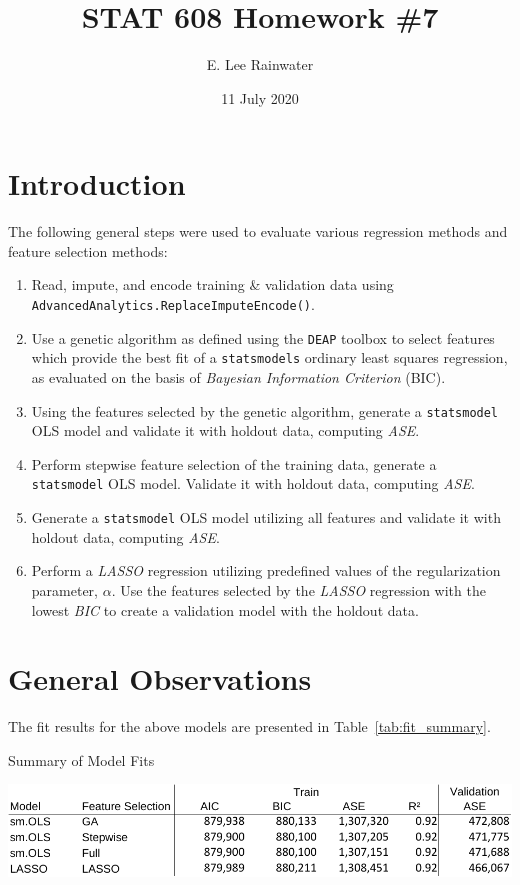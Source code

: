 \documentclass[12pt]{article}
\title{STAT 608 Homework \#7}
\author{E. Lee Rainwater}
\date{11 July 2020}
\begin{document}
\maketitle

\section{Introduction}

The following general steps were used to evaluate various regression
methods and feature selection methods: 
\begin{enumerate}
\item Read, impute, and encode training \& validation data using\\
 \texttt{AdvancedAnalytics.ReplaceImputeEncode()}. 
\item Use a genetic algorithm as defined using the \texttt{DEAP} toolbox
to select features which provide the best fit of a \texttt{statsmodels}
ordinary least squares regression, as evaluated on the basis of \textit{Bayesian
Information Criterion} (BIC). 
\item Using the features selected by the genetic algorithm, generate a \texttt{statsmodel}
OLS model and validate it with holdout data, computing \textit{ASE}. 
\item Perform stepwise feature selection of the training data, generate
a \texttt{statsmodel} OLS model. Validate it with holdout data, computing
\textit{ASE}. 
\item Generate a \texttt{statsmodel} OLS model utilizing all features and
validate it with holdout data, computing \textit{ASE}. 
\item Perform a \textit{LASSO} regression utilizing predefined values of
the regularization parameter, $\alpha$. Use the features selected
by the \textit{LASSO} regression with the lowest \textit{BIC} to create
a validation model with the holdout data.
\end{enumerate}

\section{General Observations}

The fit results for the above models are presented in Table~\ref{tab:fit_summary}.

\begin{table}
    \caption{Summary of Model Fits}
    \label{tab:fit_summary}
    \includegraphics[width=\textwidth,height=\textheight,keepaspectratio]{table01-crop}
\end{table}
\end{document}

